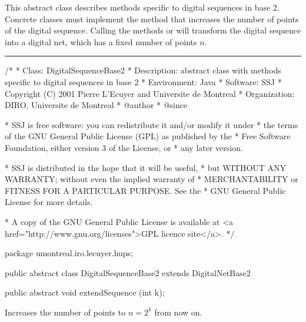 
This abstract class describes methods specific to digital sequences in base 2.
Concrete classes must implement the  method
that increases the number of points of the digital sequence.
Calling the  methods  or 
will transform the digital sequence into a digital net, which has
a fixed number of points $n$.


\bigskip\hrule\bigskip

\begin{code}
\begin{hide}
/*
 * Class:        DigitalSequenceBase2
 * Description:  abstract class with methods specific to digital sequences
                 in base 2
 * Environment:  Java
 * Software:     SSJ 
 * Copyright (C) 2001  Pierre L'Ecuyer and Universite de Montreal
 * Organization: DIRO, Universite de Montreal
 * @author       
 * @since

 * SSJ is free software: you can redistribute it and/or modify it under
 * the terms of the GNU General Public License (GPL) as published by the
 * Free Software Foundation, either version 3 of the License, or
 * any later version.

 * SSJ is distributed in the hope that it will be useful,
 * but WITHOUT ANY WARRANTY; without even the implied warranty of
 * MERCHANTABILITY or FITNESS FOR A PARTICULAR PURPOSE.  See the
 * GNU General Public License for more details.

 * A copy of the GNU General Public License is available at
   <a href="http://www.gnu.org/licenses">GPL licence site</a>.
 */
\end{hide}
package umontreal.iro.lecuyer.hups;


public abstract class DigitalSequenceBase2 extends DigitalNetBase2 \begin{hide} { 

\end{hide}

   public abstract void extendSequence (int k);
\end{code} 
\begin{tabb}
    Increases the number of points to $n = 2^k$ from now on.
\end{tabb}
\begin{htmlonly}
\end{htmlonly}
